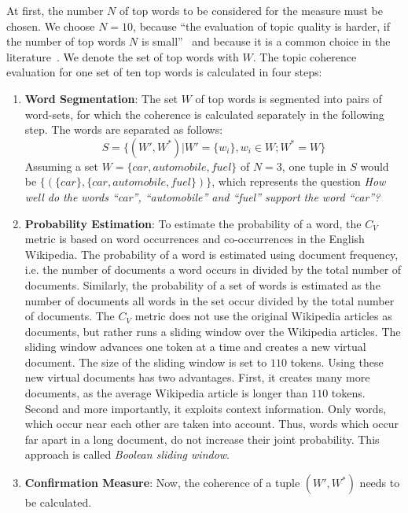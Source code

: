 \documentclass[
        a4paper,
        titlepage,
        twoside,
        parskip
        ]{scrbook}
\theoremstyle{break}
\begin{document}
At first, the number $N$ of top words to be considered for the measure must be chosen.
We choose $N=10$, because ``the evaluation of topic quality is harder, if the number of top words $N$ is small''~\cite{Roder2015} and because it is a common choice in the literature~\cite{Aletras2013,Roder2015}.
We denote the set of top words with $W$.
The topic coherence evaluation for one set of ten top words is calculated in four steps:
\begin{enumerate}
  \item \textbf{Word Segmentation}:
    The set $W$ of top words is segmented into pairs of word-sets, for which the coherence is calculated separately in the following step.
    The words are separated as follows:
    \begin{equation*}
      S = \{ (W', W^*) | W' = \{w_i\}, w_i \in W; W^* = W \}
    \end{equation*}
    Assuming a set $W = \{ car, automobile, fuel \}$ of $N = 3$, one tuple in $S$ would be $\{ (\{car\}, \{car, automobile, fuel\})\}$, which represents the question \emph{How well do the words ``car'', ``automobile'' and ``fuel'' support the word ``car''?}
  \item \textbf{Probability Estimation}:
    To estimate the probability of a word, the $C_V$ metric is based on word occurrences and co-occurrences in the English Wikipedia.
    The probability of a word is estimated using document frequency, i.e. the number of documents a word occurs in divided by the total number of documents.
    Similarly, the probability of a set of words is estimated as the number of documents all words in the set occur divided by the total number of documents.
    The $C_V$ metric does not use the original Wikipedia articles as documents, but rather runs a sliding window over the Wikipedia articles.
    The sliding window advances one token at a time and creates a new virtual document.
    The size of the sliding window is set to $110$ tokens.
    Using these new virtual documents has two advantages.
    First, it creates many more documents, as the average Wikipedia article is longer than $110$ tokens.
    Second and more importantly, it exploits context information.
    Only words, which occur near each other are taken into account.
    Thus, words which occur far apart in a long document, do not increase their joint probability.
    This approach is called \emph{Boolean sliding window}.
  \item \textbf{Confirmation Measure}:
    Now, the coherence of a tuple $(W', W^*)$ needs to be calculated.

\end{enumerate}
\end{document}
